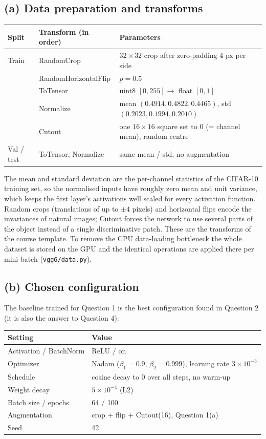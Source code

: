 \documentclass[11pt,a4paper]{article}
\begin{document}
\subsection*{(a) Data preparation and transforms}

\begin{center}
\small
\begin{tabular}{lll}
\toprule
Split & Transform (in order) & Parameters \\
\midrule
Train & RandomCrop & $32\times32$ crop after zero-padding 4 px per side \\
      & RandomHorizontalFlip & $p=0.5$ \\
      & ToTensor & uint8 $[0,255]\to$ float $[0,1]$ \\
      & Normalize & mean $(0.4914, 0.4822, 0.4465)$, std $(0.2023, 0.1994, 0.2010)$ \\
      & Cutout & one $16\times16$ square set to 0 (= channel mean), random centre \\
\midrule
Val / test & ToTensor, Normalize & same mean / std, no augmentation \\
\bottomrule
\end{tabular}
\end{center}

The mean and standard deviation are the per-channel statistics of the CIFAR-10 training set, so the normalised inputs have roughly zero mean and unit variance, which keeps the first layer's activations well scaled for every activation function. Random crops (translations of up to $\pm4$ pixels) and horizontal flips encode the invariances of natural images; Cutout forces the network to use several parts of the object instead of a single discriminative patch. These are the transforms of the course template. To remove the CPU data-loading bottleneck the whole dataset is stored on the GPU and the identical operations are applied there per mini-batch (\texttt{vgg6/data.py}).

\subsection*{(b) Chosen configuration}

The baseline trained for Question 1 is the best configuration found in Question 2 (it is also the answer to Question 4):

\begin{center}
\begin{tabular}{ll}
\toprule
Setting & Value \\
\midrule
Activation / BatchNorm & ReLU / on \\
Optimizer & Nadam ($\beta_1=0.9$, $\beta_2=0.999$), learning rate $3\times10^{-3}$ \\
Schedule & cosine decay to 0 over all steps, no warm-up \\
Weight decay & $5\times10^{-4}$ (L2) \\
Batch size / epochs & 64 / 100 \\
Augmentation & crop + flip + Cutout(16), Question 1(a) \\
Seed & 42 \\
\bottomrule
\end{tabular}
\end{center}
\end{document}

